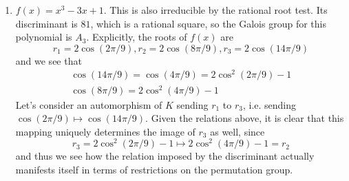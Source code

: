 \documentclass[a4paper,10pt]{article}
\theoremstyle{definition}
\begin{document}
\begin{enumerate}
\item $f(x)=x^3-3x+1$. This is also irreducible by the rational root test. Its discriminant is $81$, which is a rational square, so the Galois group for this polynomial is $A_3$. Explicitly, the roots of $f(x)$ are
\[r_1=2\cos(2\pi/9), r_2=2\cos(8\pi/9), r_3=2\cos(14\pi/9)\]
and we see that
\begin{gather*}
\cos(14\pi/9)=\cos(4\pi/9)=2\cos^2(2\pi/9)-1\\
\cos(8\pi/9)=2\cos^2(4\pi/9)-1
\end{gather*}
Let's consider an automorphism of $K$ sending $r_1$ to $r_3$, i.e. sending $\cos(2\pi/9)\mapsto\cos(14\pi/9)$. Given the relations above, it is clear that this mapping uniquely determines the image of $r_3$ as well, since
\[r_3=2\cos^2(2\pi/9)-1\mapsto 2\cos^2(4\pi/9)-1=r_2\]
and thus we see how the relation imposed by the discriminant actually manifests itself in terms of restrictions on the permutation group.
\end{enumerate}
\end{document}
